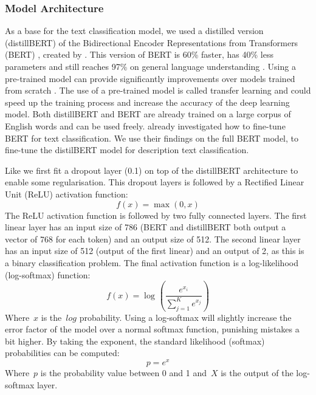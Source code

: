 \documentclass[a4paper, 12pt, oneside]{book} %
\begin{document}
\subsubsection{Model Architecture} \label{par:Architecture}
As a base for the text classification model, we used a distilled version (distillBERT) of the Bidirectional Encoder Representations from Transformers (BERT) \autocite{devlin_bert_2019}, created by \textcite{sanh_distilbert_2020}. 
This version of BERT is 60\% faster, has 40\% less parameters and still reaches 97\% on general language understanding \autocite{sanh_distilbert_2020}.
Using a pre-trained model can provide significantly improvements over models trained from scratch \autocite{mikolov_distributed_2013}.
The use of a pre-trained model is called transfer learning and could speed up the training process and increase the accuracy of the deep learning model.
Both distillBERT and BERT are already trained on a large corpus of English words and can be used freely.
\textcite{sun_how_2020} already investigated how to fine-tune BERT for text classification.
We use their findings on the full BERT model, to fine-tune the distilBERT model for description text classification.

Like \textcite{sun_how_2020} we first fit a dropout layer (0.1) on top of the distillBERT architecture to enable some regularisation.
This dropout layers is followed by a Rectified Linear Unit (ReLU) activation function:
\begin{equation} \label{ReLU}
    f(x) = \max(0, x)
\end{equation}
The ReLU activation function is followed by two fully connected layers.
The first linear layer has an input size of 786 (BERT and distillBERT both output a vector of 768 for each token) and an output size of 512.
The second linear layer has an input size of 512 (output of the first linear) and an output of 2, as this is a binary classification problem.
The final activation function is a log-likelihood (log-softmax) function:
\begin{equation} \label{eq:logsoftmax}
    f(x) = \log_{}(\frac{e^{x_i}}{\sum_{j=1}^K e^{x_j}})
\end{equation}
Where~$x$ is the~$log$ probability.
Using a log-softmax will slightly increase the error factor of the model over a normal softmax function, punishing mistakes a bit higher.
By taking the exponent, the standard likelihood (softmax) probabilities can be computed:
\begin{equation}
    p = e^{x} 
\end{equation}
Where~$p$ is the probability value between 0 and 1 and~$X$ is the output of the log-softmax layer.
\end{document}
